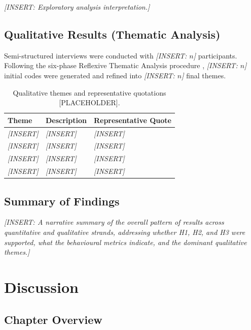 \documentclass[12pt,a4paper]{report}
\begin{document}
\textit{[INSERT: Exploratory analysis interpretation.]}

\section{Qualitative Results (Thematic Analysis)}

Semi-structured interviews were conducted with \textit{[INSERT: $n$]} participants. Following the six-phase Reflexive Thematic Analysis procedure \citep{braun2022thematic}, \textit{[INSERT: $n$]} initial codes were generated and refined into \textit{[INSERT: $n$]} final themes.

\begin{table}[H]
\centering
\caption{Qualitative themes and representative quotations [PLACEHOLDER].}
\label{tab:themes}
\small
\begin{tabular}{@{}p{3cm}p{4cm}p{6cm}@{}}
\toprule
\textbf{Theme} & \textbf{Description} & \textbf{Representative Quote} \\
\midrule
\textit{[INSERT]} & \textit{[INSERT]} & \textit{[INSERT]} \\
\textit{[INSERT]} & \textit{[INSERT]} & \textit{[INSERT]} \\
\textit{[INSERT]} & \textit{[INSERT]} & \textit{[INSERT]} \\
\textit{[INSERT]} & \textit{[INSERT]} & \textit{[INSERT]} \\
\bottomrule
\end{tabular}
\end{table}

\section{Summary of Findings}

\textit{[INSERT: A narrative summary of the overall pattern of results across quantitative and qualitative strands, addressing whether H1, H2, and H3 were supported, what the behavioural metrics indicate, and the dominant qualitative themes.]}


\chapter{Discussion}

\section{Chapter Overview}
\end{document}

